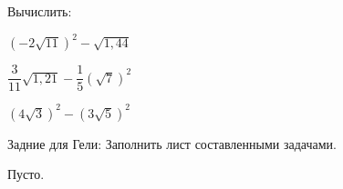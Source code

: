 \begin{class}[number=1]
\begin{listofex}[resume]
\begin{enumcols}[itemcolumns=3]
		\end{enumcols}
		\item Вычислить:
		\begin{enumcols}[itemcolumns=3]
			\item \( (-2\sqrt{11})^2-\sqrt{1,44} \)
			\item \( \dfrac{3}{11}\sqrt{1,21}-\dfrac{1}{5}(\sqrt{7})^2 \)
			\item \( (4\sqrt{3})^2-(3\sqrt{5})^2 \)
		\end{enumcols}
	\end{listofex}
\end{class}
%
%
\begin{class}[number=2]
	\begin{listofex}
		\item Задние для Гели: Заполнить лист составленными задачами.
	\end{listofex}
\end{class}
%
%
\begin{homework}[number=1]
	\begin{listofex}
		\item Пусто.
	\end{listofex}
\end{homework}
%
%
